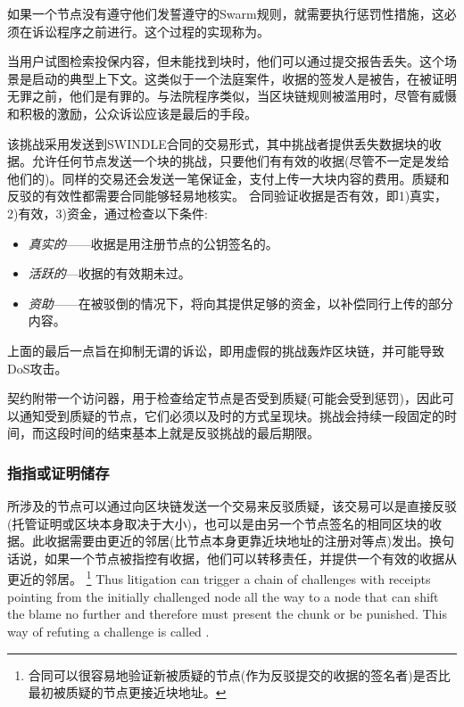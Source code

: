 如果一个节点没有遵守他们发誓遵守的Swarm规则，就需要执行惩罚性措施，这必须在诉讼程序之前进行。这个过程的实现称为。

当用户试图检索投保内容，但未能找到块时，他们可以通过提交报告丢失。这个场景是启动的典型上下文。这类似于一个法庭案件，收据的签发人是被告，在被证明无罪之前，他们是有罪的。与法院程序类似，当区块链规则被滥用时，尽管有威慑和积极的激励，公众诉讼应该是最后的手段。


该挑战采用发送到SWINDLE合同的交易形式，其中挑战者提供丢失数据块的收据。允许任何节点发送一个块的挑战，只要他们有有效的收据(尽管不一定是发给他们的)。同样的交易还会发送一笔保证金，支付上传一大块内容的费用。质疑和反驳的有效性都需要合同能够轻易地核实。
合同验证收据是否有效，即1)真实，2)有效，3)资金，通过检查以下条件:

\begin{itemize}
\item \emph{真实的}——收据是用注册节点的公钥签名的。
\item \emph{活跃的}—收据的有效期未过。
\item \emph{资助}——在被驳倒的情况下，将向其提供足够的资金，以补偿同行上传的部分内容。
\end{itemize}

上面的最后一点旨在抑制无谓的诉讼，即用虚假的挑战轰炸区块链，并可能导致DoS攻击。

契约附带一个访问器，用于检查给定节点是否受到质疑(可能会受到惩罚)，因此可以通知受到质疑的节点，它们必须以及时的方式呈现块。挑战会持续一段固定的时间，而这段时间的结束基本上就是反驳挑战的最后期限。 


\subsubsection{指指或证明储存}


所涉及的节点可以通过向区块链发送一个交易来反驳质疑，该交易可以是直接反驳(托管证明或区块本身取决于大小)，也可以是由另一个节点签名的相同区块的收据。此收据需要由更近的邻居(比节点本身更靠近块地址的注册对等点)发出。换句话说，如果一个节点被指控有收据，他们可以转移责任，并提供一个有效的收据从更近的邻居。%
%
\footnote{合同可以很容易地验证新被质疑的节点(作为反驳提交的收据的签名者)是否比最初被质疑的节点更接近块地址。}
%
Thus litigation can trigger a chain of challenges with receipts pointing from the initially challenged node all the way to a node that can shift the blame no further and therefore must present the chunk or be punished. This way of refuting a challenge is called . 

